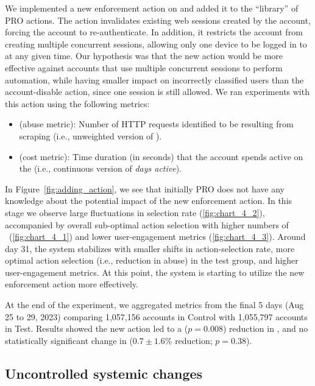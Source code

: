  We implemented a new enforcement action on \fb and added it to the ``library'' of PRO actions. The action invalidates existing web sessions created by the account, forcing the account to re-authenticate. In addition, it restricts the account from creating multiple concurrent sessions, allowing only one device to be logged in to \fb{} at any given time. Our hypothesis was that the new action would be more effective against accounts that use multiple concurrent sessions to perform automation, while having smaller impact on incorrectly classified users than the account-disable action, since one session is still allowed. We ran experiments with this action using the following metrics:

\begin{itemize}
\squeezelist
    \item \automation (abuse metric): Number of HTTP requests identified to be resulting from scraping (i.e., unweighted version of \scraping).
    \item \timespent (cost metric): Time duration (in seconds) that the account spends active on the \osn (i.e., continuous version of \emph{days active}).
\end{itemize}

In Figure~\ref{fig:adding_action}, we see that initially PRO does not have any knowledge about the potential impact of the new enforcement action. In this stage we observe large fluctuations in selection rate (\ref{fig:chart_4_2}), accompanied by overall sub-optimal action selection with higher numbers of \automation~(\ref{fig:chart_4_1}) and lower user-engagement metrics (\ref{fig:chart_4_3}). Around day 31, the system stabilizes with smaller shifts in action-selection rate, more optimal action selection (i.e., reduction in abuse) in the test group, and higher user-engagement metrics. At this point, the system is starting to utilize the new enforcement action more effectively.

At the end of the experiment, we aggregated metrics from the final 5 days (Aug 25 to 29, 2023) comparing 1,057,156 accounts in Control with 1,055,797 accounts in Test. Results showed the new action led to a {\bf \newresponsereduction} ($p=0.008$) reduction in \automation, and no statistically significant change in \timespent ($0.7 \pm 1.6\%$ reduction; $p=0.38$).

\subsection{Uncontrolled systemic changes}
\label{ss:adaptation}

